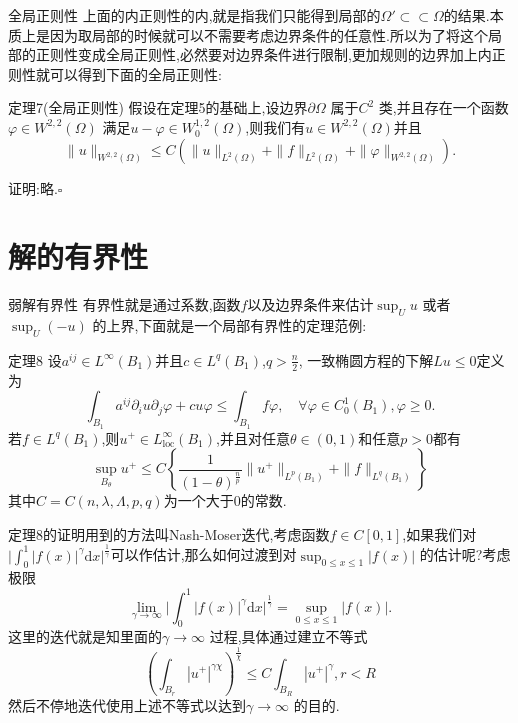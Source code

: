 \begin{frame}[t]{全局正则性}
 上面的内正则性的内,就是指我们只能得到局部的$\Omega'\subset \subset \Omega$的结果.本质上是因为取局部的时候就可以不需要考虑边界条件的任意性.所以为了将这个局部的正则性变成全局正则性,必然要对边界条件进行限制,更加规则的边界加上内正则性就可以得到下面的全局正则性:
 \begin{alertblock}{定理7(全局正则性)}
   假设在定理5的基础上,设边界$\partial\Omega$ 属于$C^{2}$ 类,并且存在一个函数$\varphi \in W^{2,2}(\Omega)$ 满足$u-\varphi \in W^{1,2}_0(\Omega)$,则我们有$u \in W^{2,2}(\Omega)$并且
   \begin{equation}
     \|u\|_{W^{2,2}(\Omega)}\le C \left( \|u\|_{L^{2}(\Omega)}+\|f\|_{L^{2}(\Omega)}+\|\varphi\|_{W^{2,2}(\Omega)} \right) .
   \end{equation}
 \end{alertblock}
 证明:略.\hfill $\square$\par
\end{frame}
\section{解的有界性}
\begin{frame}{弱解有界性}
  有界性就是通过系数,函数$f$以及边界条件来估计$\sup_{U}u$ 或者$\sup_{U}(-u)$ 的上界,下面就是一个局部有界性的定理范例:
  \begin{alertblock}{定理8}
    设$a^{ij} \in L^{\infty}(B_1)$并且$c\in L^{q}(B_1)$,$q>\frac{n}{2}$, 一致椭圆方程的下解$Lu\le 0$定义为
     \[
       \int_{B_1}a^{ij}\partial_iu \partial_j \varphi +cu\varphi\le \int_{B_1}f\varphi,\quad\forall \varphi \in C_0^{1}(B_1),\varphi\ge 0.
    \] 
    若$f\in L^{q}(B_1)$,则$u^{+}\in L_{\mathrm{loc}}^{\infty}(B_1)$,并且对任意$\theta \in (0,1)$和任意$p>0$都有
     \[
       \sup_{B_\theta}u^{+}\le C\left\{ \frac{1}{(1-\theta)^{\frac{n}{p}}}\|u^{+}\|_{L^{p}(B_1)}+\|f\|_{L^{q}(B_1)} \right\} 
    \] 
    其中$C=C(n,\lambda,\Lambda,p,q)$为一个大于$0$的常数.
  \end{alertblock}
\end{frame}
\begin{frame}[t]
  定理8的证明用到的方法叫Nash-Moser迭代,考虑函数$f\in C[0,1]$,如果我们对$\lvert\int_0^{1}|f(x)|^{\gamma}\mathrm{d}x\rvert ^{\frac{1}{\gamma}}$可以作估计,那么如何过渡到对$\sup_{0\le x\le 1}|f(x)|$ 的估计呢?考虑极限
  \[
    \lim_{\gamma\to \infty}\lvert \int_0^{1}|f(x)|^{\gamma}\mathrm{d}x \rvert ^{\frac{1}{\gamma}}=\sup_{0\le x\le 1}|f(x)|.
  \]
  这里的迭代就是知里面的$\gamma\to \infty$ 过程,具体通过建立不等式
  \[
    \left( \int_{B_r}|u^{+}|^{\gamma\chi} \right) ^{\frac{1}{\chi}}\le C\int_{B_R}|u^{+}|^{\gamma},r<R
  \] 
  然后不停地迭代使用上述不等式以达到$\gamma\to \infty$ 的目的.
\end{frame}
